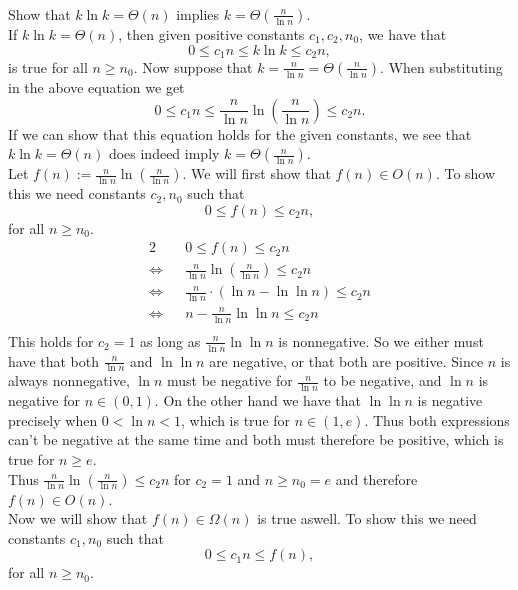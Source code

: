 \documentclass[11pt]{article}
\numberwithin{equation}{section}
\renewcommand{\iff}{\Leftrightarrow}
\begin{document}
\pagebreak
\subsubsection{}
Show that $k\ln k = \Theta(n)$ implies $k = \Theta\left(\frac{n}{\ln n}\right)$.\\

If $k\ln k = \Theta(n)$, then given positive constants $c_1,c_2,n_0$, we have that
\[
    0 \leq c_1 n \leq k \ln k \leq c_2 n,
\]
is true for all $n \geq n_0$. Now suppose that $k = \frac{n}{\ln n} = \Theta(\frac{n}{\ln n})$.
When substituting in the above equation we get 
\[
    0 \leq c_1 n \leq \frac{n}{\ln n} \ln \left(\frac{n}{\ln n}\right) \leq c_2 n.
\]
If we can show that this equation holds for the given constants, we see that 
$k\ln k = \Theta(n)$ does indeed imply $k = \Theta\left(\frac{n}{\ln n}\right)$.\\
Let $f(n) := \frac{n}{\ln n} \ln \left(\frac{n}{\ln n}\right)$. We will first show that
$f(n) \in O(n)$. To show this we need constants $c_2, n_0$ such that 
\[
    0 \leq f(n) \leq c_2 n,
\]
for all $n\geq n_0$.
\begin{alignat*}{2}
    && 0 \leq f(n) \leq c_2 n\\
    \iff&& \frac{n}{\ln n} \ln \left(\frac{n}{\ln n}\right)  \leq c_2 n\\
    \iff&& \frac{n}{\ln n} \cdot \left( \ln n - \ln \ln n\right) \leq c_2 n\\
    \iff&& n -\frac{n}{\ln n} \ln \ln n \leq c_2 n\\
\end{alignat*}
This holds for $c_2 = 1$ as long as $\frac{n}{\ln n} \ln \ln n$ is nonnegative.
So we either must have that both $\frac{n}{\ln n}$ and $\ln\ln n$ are negative, or that
both are positive. Since $n$ is always nonnegative, $\ln n$ must be negative for $\frac{n}{\ln n}$
to be negative, and $\ln n$ is negative for $n \in (0,1)$. On the other hand we have that $\ln \ln n$
is negative precisely when $0 < \ln n < 1$, which is true for $n \in (1, e)$. Thus both expressions can't 
be negative at the same time and both must therefore be positive, which is true for $n \geq e$.\\ Thus
$\frac{n}{\ln n} \ln \left(\frac{n}{\ln n}\right)  \leq c_2 n$ for $c_2 = 1$ and $n \geq n_0 = e$ and therefore
$f(n) \in O(n)$.\\
Now we will show that $f(n) \in \Omega(n)$ is true aswell. To show this we need constants $c_1, n_0$ such that
\[
    0 \leq c_1n \leq f(n),
\]
for all $n\geq n_0$.
\end{document}
